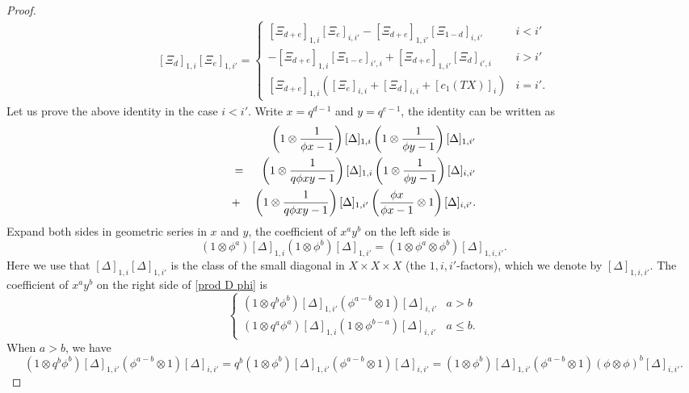 \documentclass[10pt,a4paper]{amsart}
\newcommand\D\Delta
\newcommand\ot{\otimes}
\begin{document}
\begin{proof}
    \begin{eqnarray}\label{Xi prod}
        [\Xi_d]_{1,i}[\Xi_e]_{1,i'}=\begin{cases}
            [\Xi_{d+e}]_{1,i}[\Xi_{e}]_{i,i'}-[\Xi_{d+e}]_{1,i'}[\Xi_{1-d}]_{i,i'} & i<i'\\
            -[\Xi_{d+e}]_{1,i}[\Xi_{1-e}]_{i',i}+[\Xi_{d+e}]_{1,i'}[\Xi_d]_{i',i}& i>i'\\
            [\Xi_{d+e}]_{1,i}\left([\Xi_e]_{i,i}+[\Xi_d]_{i,i}+[c_1(TX)]_i\right) & i=i'.
        \end{cases}
    \end{eqnarray}
    Let us prove the above identity in the case $i<i'$. Write $x=q^{d-1}$ and $y=q^{e-1}$, the identity can be written as
    \begin{eqnarray}\label{prod D phi}
        &&\left(1\ot \frac{1}{\phi x-1}\right)[\D]_{1,i}\left(1\ot \frac{1}{\phi y-1}\right)[\D]_{1,i'}\\
\notag        &=& \left(1\ot \frac{1}{q\phi xy-1}\right)[\D]_{1,i}\left(1\ot \frac{1}{\phi y-1}\right)[\D]_{i,i'}\\
\notag        &+&\left(1\ot \frac{1}{q\phi xy-1}\right)[\D]_{1,i'}\left(\frac{\phi x}{\phi x-1}\ot1\right)[\D]_{i,i'}.
    \end{eqnarray}
    Expand both sides in geometric series in $x$ and $y$, the coefficient of $x^ay^b$ on the left side is 
    \begin{equation}\label{left xy}
        (1\ot \phi^a)[\D]_{1,i}(1\ot \phi^b)[\D]_{1,i'}=(1\ot \phi^a\ot \phi^b)[\D]_{1,i,i'}.
    \end{equation}
    Here we use that $[\D]_{1,i}[\D]_{1,i'}$ is the class of the small diagonal in $X\times X\times X$ (the $1,i,i'$-factors), which we denote by $[\D]_{1,i,i'}$. The coefficient of $x^ay^b$ on the right side of \eqref{prod D phi} is
    \begin{equation}\label{right xy}
        \begin{cases}
            (1\ot q^b\phi^b)[\D]_{1,i'}(\phi^{a-b}\ot1)[\D]_{i,i'}& a>b\\
            (1\ot q^a\phi^a)[\D]_{1,i}(1\ot \phi^{b-a})[\D]_{i,i'}  & a\le b.
        \end{cases}
    \end{equation}
    When $a>b$, we have
    \begin{equation*}
        (1\ot q^b\phi^b)[\D]_{1,i'}(\phi^{a-b}\ot1)[\D]_{i,i'}=q^b(1\ot \phi^b)[\D]_{1,i'}(\phi^{a-b}\ot1)[\D]_{i,i'}=(1\ot \phi^b)[\D]_{1,i'}(\phi^{a-b}\ot1)(\phi\ot \phi)^b[\D]_{i,i'}.

\end{equation*}
\end{proof}
\end{document}
